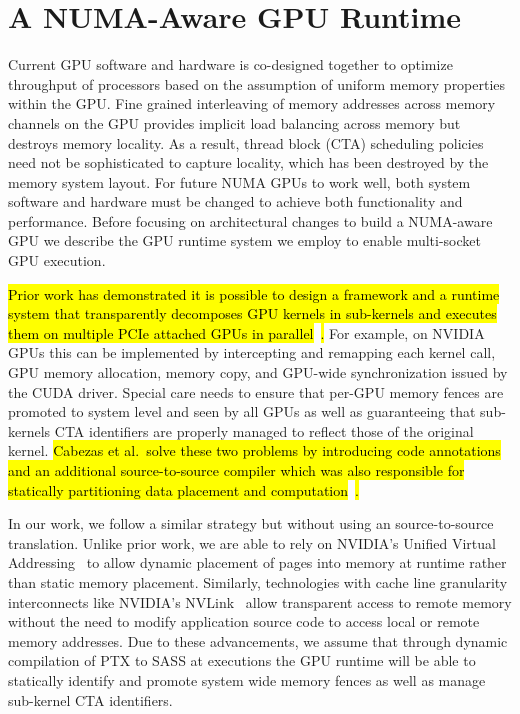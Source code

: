 \section{A NUMA-Aware GPU Runtime}

Current GPU software and hardware is co-designed together to optimize 
throughput of processors based on the assumption of uniform memory properties 
within the GPU. Fine grained interleaving of memory addresses across memory 
channels on the GPU provides implicit load balancing across memory but destroys 
memory locality.  As a result, thread block (CTA) scheduling policies need not 
be sophisticated to capture locality, which has been destroyed by the 
memory system layout.  For future NUMA GPUs to work well, both system software and 
hardware must be changed to achieve both functionality and performance.  Before 
focusing on architectural changes to build a NUMA-aware GPU we describe the GPU 
runtime system we employ to enable multi-socket GPU execution.

\hl{Prior work has demonstrated it is possible to design a framework and a runtime 
system that transparently decomposes GPU kernels in sub-kernels and executes 
them on multiple PCIe attached GPUs in parallel}~\cite{Cabezas2015,ZiabariTACO-16}\hl{.} For example, on NVIDIA GPUs 
this can be implemented by intercepting and remapping each kernel call, GPU 
memory allocation, memory copy, and GPU-wide synchronization issued by the CUDA 
driver. Special care needs to ensure that per-GPU memory fences are promoted to 
system level and seen by all GPUs as well as guaranteeing that sub-kernels CTA 
identifiers are properly managed to reflect those of the original kernel. \hl{Cabezas et al.~solve 
these two problems by introducing  code 
annotations and an additional source-to-source compiler which was also 
responsible for statically partitioning data placement and computation}~\cite{Cabezas2015}\hl{.}

In our work, we follow a similar strategy but without using an source-to-source
translation. Unlike prior work, we are able to rely on NVIDIA's Unified Virtual 
Addressing~\cite{UVM} to allow dynamic placement of pages into memory at
runtime rather than static memory placement.  Similarly, technologies with
cache line granularity interconnects like NVIDIA's NVLink~\cite{NVLINK} allow
transparent access to remote memory without the need to modify application
source code to access local or remote memory addresses.  Due to these
advancements, we assume that through dynamic compilation of PTX to SASS at
executions the GPU runtime will be able to statically identify and promote 
system wide memory fences as well as manage sub-kernel CTA identifiers.

